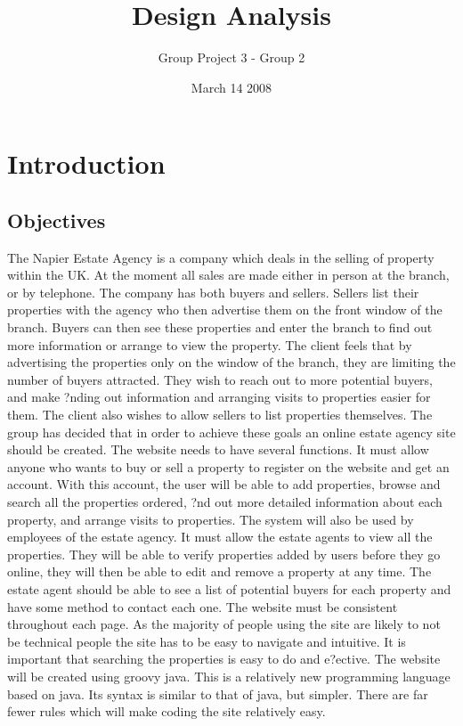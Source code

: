 \documentclass[a4paper,12pt]{article}
\title{Design Analysis}
\author{Group Project 3 - Group 2}
\date{March 14 2008}
\begin{document}
\maketitle
\newpage
\tableofcontents
\newpage



\section{Introduction}
\subsection{Objectives}
The Napier Estate Agency is a company which deals in the selling of property within the UK. At the moment all sales are made either in person at the branch, or by telephone. The company has both buyers and sellers. Sellers list their properties with the agency who then advertise them on the front window of the branch. Buyers can then see these properties and enter the branch to find out more information or arrange to view the property.
The client feels that by advertising the properties only on the window of the branch, they are limiting the number of buyers attracted. They wish to reach out to more potential buyers, and make ?nding out information and arranging visits to properties easier for them. The client also wishes to allow sellers to list properties themselves. The group has decided that in order to achieve these goals an online estate agency site should be created.
The website needs to have several functions. It must allow anyone who wants to buy or sell a property to register on the website and get an account.
With this account, the user will be able to add properties, browse and search all the properties ordered, ?nd out more detailed information about each property, and arrange visits to properties.
The system will also be used by employees of the estate agency. It must allow the estate agents to view all the properties. They will be able to verify properties added by users before they go online, they will then be able to edit and remove a property at any time. The estate agent should be able to see a list of potential buyers for each property and have some method to contact each one.
The website must be consistent throughout each page. As the majority of people using the site are likely to not be technical people the site has to be easy to navigate and intuitive. It is important that searching the properties is easy to do and e?ective.
The website will be created using groovy java. This is a relatively new programming language based on java. Its syntax is similar to that of java, but simpler. There are far fewer rules which will make coding the site relatively easy.
\end{document}
